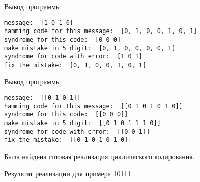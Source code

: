 
\parindent=1cm %

Вывод программы

\begin{lstlisting}
message:  [1 0 1 0]
hamming code for this message:  [0, 1, 0, 0, 1, 0, 1]
syndrome for this code:  [0 0 0]
make mistake in 5 digit:  [0, 1, 0, 0, 0, 0, 1]
syndrome for code with error:  [1 0 1]
fix the mistake:  [0, 1, 0, 0, 1, 0, 1]
\end{lstlisting}


\parindent=1cm %

Вывод программы

\begin{lstlisting}
message:  [[0 1 0 1]]
hamming code for this message:  [[0 1 0 1 0 1 0]]
syndrome for this code:  [[0 0 0]]
make mistake in 5 digit:  [[0 1 0 1 1 1 0]]
syndrome for code with error:  [[0 0 1]]
fix the mistake:  [[0 1 0 1 0 1 0]]
\end{lstlisting}

Была найдена готовая реализация циклического кодирования.

Результат реализации для примера 10111

